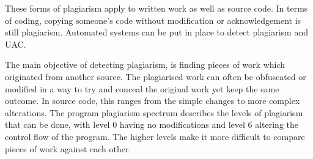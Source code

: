 These forms of plagiarism apply to written work as well as source code. In terms of coding, copying someone's code without modification or acknowledgement is still plagiarism. Automated systems can be put in place to detect plagiarism and UAC.

The main objective of detecting plagiarism, is finding pieces of work which originated from another source. The plagiarised work can often be obfuscated or modified in a way to try and conceal the original work yet keep the same outcome. In source code, this ranges from the simple changes to more complex alterations. The program plagiarism spectrum describes the levels of plagiarism that can be done, with level 0 having no modifications and level 6 altering the control flow of the program\cite{Parker1989}. The higher levels make it more difficult to compare pieces of work against each other.
